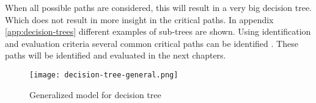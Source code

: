 When all possible paths are considered, this will result in a very big decision tree. Which does not result in more insight in the critical paths. In appendix \ref{app:decision-trees} different examples of sub-trees are shown. Using identification and evaluation criteria several common critical paths can be identified . These paths will be identified and evaluated in the next chapters.

\begin{figure}[p]
	\centering
	\texttt{[image: decision-tree-general.png]}
	\caption{Generalized model for decision tree}
	\label{fig:decision-tree-general}
\end{figure}
